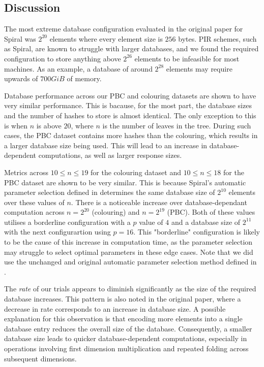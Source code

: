 \subsection{Discussion}

The most extreme database configuration evaluated in the original
paper for Spiral was $2^{20}$ elements where every element size is $256$ bytes\cite{1}.
PIR schemes, such as Spiral, are known to struggle with larger databases, and we found
the required configuration to store anything above $2^{26}$ elements to be infeasible for
most machines. As an example, a database of around $2^{28}$ elements may require upwards
of $700GiB$ of memory.

Database performance across our PBC and colouring datasets are shown to have very similar
performance. This is bacause, for the most part, the database sizes and the number of
hashes to store is almost identical. The only exception to this is when $n$ is above $20$,
where $n$ is the number of leaves in the tree. During such cases, the PBC dataset contains
more hashes than the colouring, which results in a larger database size being used. This
will lead to an increase in database-dependent computations, as well as larger response sizes.

Metrics across $10 \le n \le 19$ for the colouring dataset and $10 \le n \le 18$ for the
PBC dataset are shown to be very similar. This is because Spiral's automatic parameter
selection defined in \cite{1} determines the same database size of $2^{10}$ elements over
these values of $n$. There is a noticeable increase over database-dependant computation across
$n = 2^{20}$ (colouring) and $n = 2^{19}$ (PBC). Both of these values utilises a borderline
configuration with a $p$ value of $4$ and a database size of $2^{11}$ with the next
configurartion using $p = 16$. This "borderline" configuration is likely to be the cause
of this increase in computation time, as the parameter selection may struggle to select
optimal parameters in these edge cases. Note that we did use the unchanged and original
automatic parameter selection method defined in \cite{1}.

The \textit{rate} of our trials appears to diminish significantly as the size of the
required database increases. This pattern is also noted in the original paper\cite{1},
where a decrease in rate corresponds to an increase in database size. A possible
explanation for this observation is that encoding more elements into a single database
entry reduces the overall size of the database. Consequently, a smaller database size
leads to quicker database-dependent computations, especially in operations involving first
dimension multiplication and repeated folding across subsequent dimensions.

